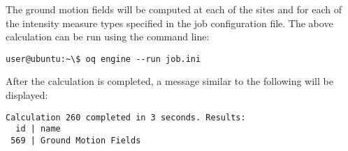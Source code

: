 The ground motion fields will be computed at each of the sites and for each of
the intensity measure types specified in the job configuration file. The
above calculation can be run using the command line:

\begin{verbatim}
user@ubuntu:~\$ oq engine --run job.ini
\end{verbatim}

After the calculation is completed, a message similar to the following will be
displayed:

\begin{verbatim}
Calculation 260 completed in 3 seconds. Results:
  id | name
 569 | Ground Motion Fields
\end{verbatim}